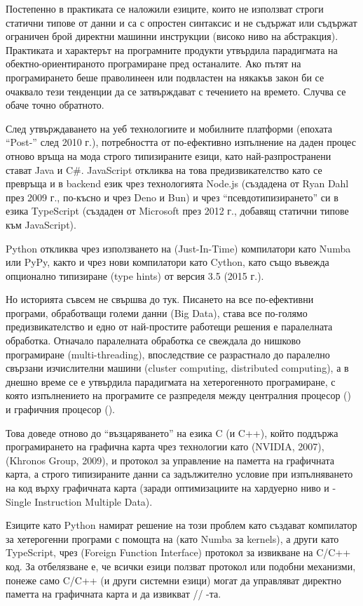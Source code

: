 Постепенно в практиката се наложили езиците, които не използват строги статични типове от данни и са с опростен синтаксис и не съдържат
или съдържат ограничен брой директни машинни инструкции (високо ниво на абстракция). Практиката и характерът на програмните продукти утвърдила парадигмата
на обектно-ориентираното програмиране пред останалите. Ако пътят на програмирането беше праволинеен
или подвластен на някакъв закон би се очаквало тези тенденции да се затвърждават с течението на времето.
Случва се обаче точно обратното.

След утвърждаването на уеб технологиите и мобилните платформи (епохата ``Post-'' след 2010 г.), потребността от по-ефективно изпълнение на
даден процес отново връща на мода строго типизираните езици, като най-разпространени стават Java и C\#.
JavaScript откликва на това предизвикателство като се превръща и в backend език чрез технологията Node.js (създадена от Ryan Dahl през 2009 г.,
по-късно и чрез Deno и Bun) и чрез ``псевдотипизирането'' си в езика TypeScript (създаден от Microsoft през 2012 г., добавящ статични типове към JavaScript).

Python откликва чрез използването
на  (Just-In-Time) компилатори като Numba или PyPy, както и чрез нови компилатори като Cython, като също въвежда опционално типизиране (type hints) от версия 3.5 (2015 г.).

Но историята съвсем не свършва до тук. Писането на все по-ефективни програми, обработващи големи данни (Big Data),
става все по-голямо предизвикателство и едно от най-простите работещи решения е паралелната обработка.
Отначало паралелната обработка се свеждала до нишково програмиране (multi-threading), впоследствие се разрастнало до
паралелно свързани изчислителни машини (cluster computing, distributed computing), а в днешно време се е утвърдила парадигмата на хетерогенното програмиране,
с която изпълнението на програмите се разпределя между централния процесор () и графичния процесор ().

Това доведе отново до ``възцаряването'' на езика C (и C++), който поддържа програмирането на графична карта чрез технологии като  (NVIDIA, 2007),  (Khronos Group, 2009),  и протокол за
управление на паметта на графичната карта, а строго типизираните данни са задължително условие
при изпълняването на код върху графичната карта (заради оптимизациите на хардуерно ниво и  - Single Instruction Multiple Data).

Езиците като Python намират решение на този проблем като
създават компилатор за хетерогенни програми с помощта на  (като Numba за  kernels), а други като TypeScript, чрез  (Foreign Function Interface) протокол за извикване на C/C++ код.
За отбелязване е, че всички езици ползват  протокол или подобни механизми, понеже само C/C++ (и други системни езици) могат да управляват директно паметта на графичната карта и да извикват // -та.

